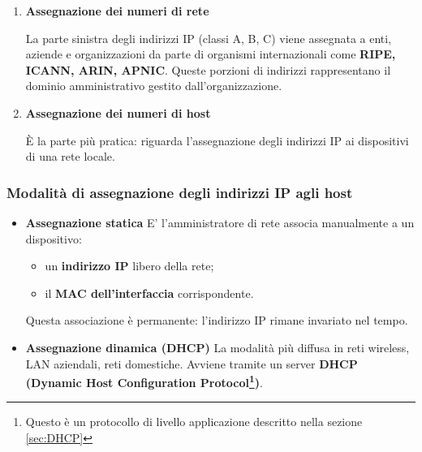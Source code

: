 \documentclass[a4paper,12pt]{report}
\begin{document}
\begin{enumerate}
    \item \textbf{Assegnazione dei numeri di rete}
    
    La parte sinistra degli indirizzi IP (classi A, B, C) viene assegnata a enti, aziende e organizzazioni
    da parte di organismi internazionali come \textbf{RIPE, ICANN, ARIN, APNIC}.  
    Queste porzioni di indirizzi rappresentano il dominio amministrativo gestito dall'organizzazione.

    \item \textbf{Assegnazione dei numeri di host}
    
    È la parte più pratica: riguarda l’assegnazione degli indirizzi IP ai dispositivi di una rete locale.
\end{enumerate}

\subsubsection*{Modalità di assegnazione degli indirizzi IP agli host}

\begin{itemize}
    \item \textbf{Assegnazione statica}  
    E' l'amministratore di rete associa manualmente a un dispositivo:
    \begin{itemize}
        \item un \textbf{indirizzo IP} libero della rete;
        \item il \textbf{MAC dell’interfaccia} corrispondente.  
    \end{itemize}
    Questa associazione è permanente: l’indirizzo IP rimane invariato nel tempo.

    \item \textbf{Assegnazione dinamica (DHCP)}  
    La modalità più diffusa in reti wireless, LAN aziendali, reti domestiche.
    Avviene tramite un server \textbf{DHCP (Dynamic Host Configuration Protocol\footnote{Questo è un protocollo di livello applicazione descritto nella sezione \ref{sec:DHCP} })}.
\end{itemize}
\end{document}
